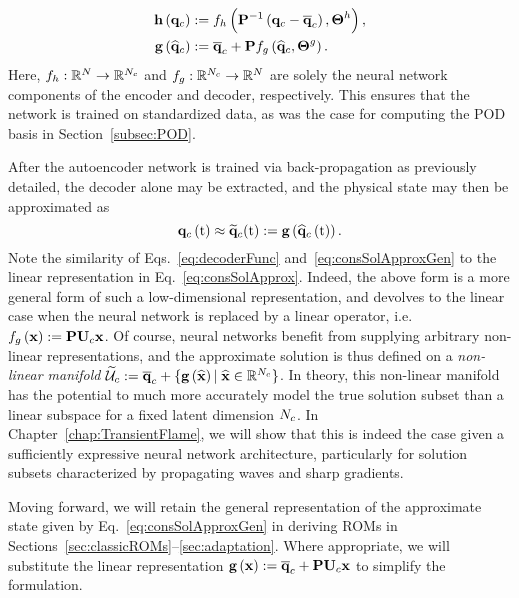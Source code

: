 %
\begin{align}
    \encoderFunc{\consVec} &\defEq \nnLayer_{\encoderVar} \left(\consScaleInv\left(\consVec - \consVecCent\right), \nnParams^{\encoderVar}\right), \\
    \decoderFunc{\consVecCoef} &\defEq \consVecCent + \consScale \nnLayer_{\decoderVar} \left(\consVecCoef, \nnParams^{\decoderVar}\right). \label{eq:decoderFunc}
\end{align}
%
Here, $f_{h}: \mathbb{R}^{N} \rightarrow \mathbb{R}^{N_c}$ and $f_{g}: \mathbb{R}^{N_c} \rightarrow \mathbb{R}^{N}$ are solely the neural network components of the encoder and decoder, respectively. This ensures that the network is trained on standardized data, as was the case for computing the POD basis in Section~\ref{subsec:POD}.

After the autoencoder network is trained via back-propagation as previously detailed, the decoder alone may be extracted, and the physical state may then be approximated as
%
\begin{equation}\label{eq:consSolApproxGen}
    \mathbf{q}_c\left(\text{t}\right) \approx \mathbf{\widetilde{q}}_c(\text{t}) := \mathbf{g} \left(\mathbf{\widehat{q}}_{c}\left(\text{t}\right)\right).
\end{equation}
%
Note the similarity of Eqs.~\ref{eq:decoderFunc} and~\ref{eq:consSolApproxGen} to the linear representation in Eq.~\ref{eq:consSolApprox}. Indeed, the above form is a more general form of such a low-dimensional representation, and devolves to the linear case when the neural network is replaced by a linear operator, i.e. $\nnLayer_{\decoderVar}\left(\nnInput\right) \defEq \consScale \consTrial \nnInput$. Of course, neural networks benefit from supplying arbitrary non-linear representations, and the approximate solution is thus defined on a \textit{non-linear manifold} $\consTrialSpace \defEq \consVecCent + \{\decoderFunc{\nnInputCoef} \vert \; \nnInputCoef \inROne{\numConsModes} \}$. In theory, this non-linear manifold has the potential to much more accurately model the true solution subset than a linear subspace for a fixed latent dimension $N_c$. In Chapter~\ref{chap:TransientFlame}, we will show that this is indeed the case given a sufficiently expressive neural network architecture, particularly for solution subsets characterized by propagating waves and sharp gradients.

Moving forward, we will retain the general representation of the approximate state given by Eq.~\ref{eq:consSolApproxGen} in deriving ROMs in Sections~\ref{sec:classicROMs}--\ref{sec:adaptation}. Where appropriate, we will substitute the linear representation $\decoderFunc{\nnInput} \defEq \consVecCent + \consScale \consTrial \nnInput$ to simplify the formulation.

